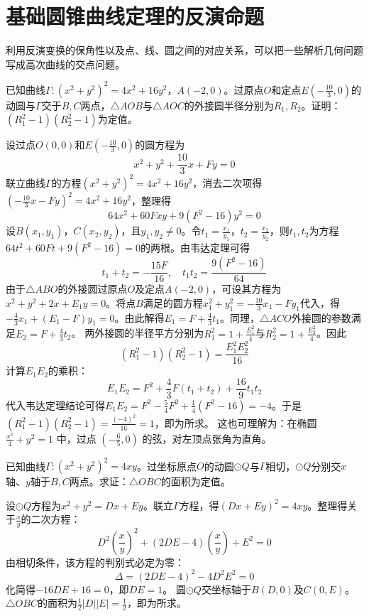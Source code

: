\section{基础圆锥曲线定理的反演命题}

利用反演变换的保角性以及点、线、圆之间的对应关系，可以把一些解析几何问题写成高次曲线的交点问题。

\begin{example}
已知曲线$\Gamma: (x^2 + y^2)^2 = 4x^2 + 16y^2$，$A(-2,0)$。过原点$O$和定点$E\left(-\frac{10}{3},0\right)$的动圆与$\Gamma$交于$B,C$两点，$\triangle AOB$与$\triangle AOC$的外接圆半径分别为$R_1,R_2$。证明：$(R_1^2 - 1)(R_2^2 - 1)$为定值。
\end{example}
\begin{solution}
设过点$O(0,0)$和$E\left(-\frac{10}{3},0\right)$的圆方程为
$$x^{2}+y^{2}+\frac{10}{3}x+Fy=0$$
联立曲线$\Gamma$的方程$(x^{2}+y^{2})^{2}=4x^{2}+16y^{2}$，消去二次项得$\left(-\frac{10}{3}x-Fy\right)^{2}=4x^{2}+16y^{2}$，整理得
$$64x^{2}+60Fxy+9(F^{2}-16)y^{2}=0$$
设$B(x_{1},y_{1})$，$C(x_{2},y_{2})$，且$y_{1},y_{2}\neq 0$。令$t_{1}=\frac{x_{1}}{y_{1}}$，$t_{2}=\frac{x_{2}}{y_{2}}$，则$t_{1},t_{2}$为方程$64t^{2}+60Ft+9(F^{2}-16)=0$的两根。由韦达定理可得
$$t_{1}+t_{2}=-\frac{15F}{16},\quad t_{1}t_{2}=\frac{9(F^{2}-16)}{64}$$
由于$\triangle ABO$的外接圆过原点$O$及定点$A(-2,0)$，可设其方程为$x^{2}+y^{2}+2x+E_{1}y=0$。将点$B$满足的圆方程$x_{1}^{2}+y_{1}^{2}=-\frac{10}{3}x_{1}-Fy_{1}$代入，得$-\frac{4}{3}x_{1}+(E_{1}-F)y_{1}=0$。由此解得$E_{1}=F+\frac{4}{3}t_{1}$。同理，$\triangle ACO$外接圆的参数满足$E_{2}=F+\frac{4}{3}t_{2}$。
两外接圆的半径平方分别为$R_{1}^{2}=1+\frac{E_{1}^{2}}{4}$与$R_{2}^{2}=1+\frac{E_{2}^{2}}{4}$。因此
$$(R_{1}^{2}-1)(R_{2}^{2}-1)=\frac{E_{1}^{2}E_{2}^{2}}{16}$$
计算$E_{1}E_{2}$的乘积：
$$E_{1}E_{2}=F^{2}+\frac{4}{3}F(t_{1}+t_{2})+\frac{16}{9}t_{1}t_{2}$$
代入韦达定理结论可得$E_{1}E_{2}=F^{2}-\frac{5}{4}F^{2}+\frac{1}{4}(F^{2}-16)=-4$。于是$(R_{1}^{2}-1)(R_{2}^{2}-1)=\frac{(-4)^{2}}{16}=1$，即为所求。
这也可理解为：在椭圆 $\frac{x^2}{4}+y^2=1$ 中，过点 $\left(-\frac{6}{5},0\right)$ 的弦，对左顶点张角为直角。
\end{solution}

\begin{example}
已知曲线$\Gamma: (x^2 + y^2)^2 = 4xy$。过坐标原点$O$的动圆$\odot Q$与$\Gamma$相切，$\odot Q$分别交$x$轴、$y$轴于$B, C$两点。求证：$\triangle OBC$的面积为定值。
\end{example}
\begin{solution}
设$\odot Q$方程为$x^2+y^2=Dx+Ey$。联立$\Gamma$方程，得$(Dx+Ey)^2=4xy$。整理得关于$\frac{x}{y}$的二次方程：
$$D^2\left(\frac{x}{y}\right)^2+(2DE-4)\left(\frac{x}{y}\right)+E^2=0$$
由相切条件，该方程的判别式必定为零：
$$\Delta=(2DE-4)^2-4D^2E^2=0$$
化简得$-16DE+16=0$，即$DE=1$。
圆$\odot Q$交坐标轴于$B(D,0)$及$C(0,E)$。$\triangle OBC$的面积为$\frac{1}{2}|D||E|=\frac{1}{2}$，即为所求。
\end{solution}

